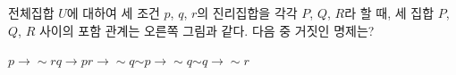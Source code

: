 \noindent\begin{minipage}[t]{0.58\linewidth}\vspace{0pt}\raggedright 전체집합 $U$에 대하여 세 조건 $p$, $q$, $r$의 진리집합을 각각 $P$, $Q$, $R$라 할 때, 세 집합 $P$, $Q$, $R$ 사이의 포함 관계는 오른쪽 그림과 같다. 다음 중 거짓인 명제는?\end{minipage}\hfill\begin{minipage}[t]{0.4\linewidth}\vspace{0pt}\centering \resizebox{\ifdim\width>\linewidth\linewidth\else\width\fi}{!}{}\end{minipage}\par
\begin{choices32}{$p\longrightarrow {\sim} r$}{$q\longrightarrow p$}{$r\longrightarrow {\sim} q$}{${\sim} p\longrightarrow {\sim} q$}{${\sim} q\longrightarrow {\sim} r$}\end{choices32}
